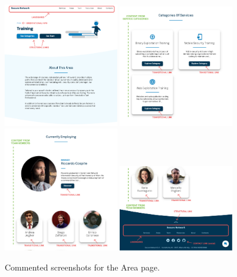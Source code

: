 \documentclass[12pt]{report}
\begin{document}
\begin{figure}[H]
	\centering
	\includegraphics[width=0.45\textwidth]{high_fid_wireframes/area/1.png}
	\includegraphics[width=0.45\textwidth]{high_fid_wireframes/area/2.png}
	\includegraphics[width=0.45\textwidth]{high_fid_wireframes/area/3.png}
	\includegraphics[width=0.45\textwidth]{high_fid_wireframes/area/4.png}
	\caption{Commented screenshots for the Area page.}
\end{figure}
\clearpage
\end{document}
